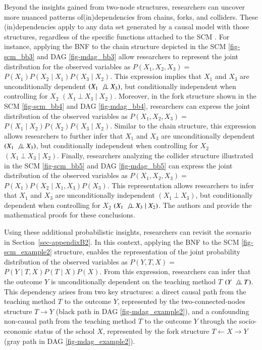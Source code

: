 \documentclass[
  authoryear,
  review,
  1p]{elsarticle}
\begin{document}
Beyond the insights gained from two-node structures, researchers can
uncover more nuanced patterns of(in)dependencies from chains, forks, and
colliders. These (in)dependencies apply to any data set generated by a
causal model with those structures, regardless of the specific functions
attached to the SCM \citep[pp.~36]{Pearl_et_al_2016}. For instance,
applying the BNF to the chain structure depicted in the SCM
\ref{fig-scm_bb3} and DAG \ref{fig-mdag_bb3} allow researchers to
represent the joint distribution for the observed variables as
\(P(X_{1},X_{2},X_{3}) =\)
\(P(X_{1}) P(X_{2} \mid X_{1}) P(X_{3} \mid X_{2})\). This expression
implies that \(X_{1}\) and \(X_{3}\) are unconditionally dependent
\((X_{1} \:\not\bot\:X_{3})\), but conditionally independent when
controlling for \(X_{2}\) \((X_{1} \:\bot\:X_{3} \mid X_{2})\).
Moreover, in the fork structure shown in the SCM \ref{fig-scm_bb4} and
DAG \ref{fig-mdag_bb4}, researchers can express the joint distribution
of the observed variables as \(P(X_{1},X_{2},X_{3}) =\)
\(P(X_{1} \mid X_{2}) P(X_{2}) P(X_{3} \mid X_{2})\). Similar to the
chain structure, this expression allows researchers to further infer
that \(X_{1}\) and \(X_{3}\) are unconditionally dependent
\((X_{1} \:\not\bot\:X_{3})\), but conditionally independent when
controlling for \(X_{2}\) \((X_{1} \:\bot\:X_{3} \mid X_{2})\). Finally,
researchers analyzing the collider structure illustrated in the SCM
\ref{fig-scm_bb5} and DAG \ref{fig-mdag_bb5} can express the joint
distribution of the observed variables as \(P(X_{1},X_{2},X_{3}) =\)
\(P(X_{1}) P(X_{2} \mid X_{1}, X_{3}) P(X_{3})\). This representation
allows researchers to infer that \(X_{1}\) and \(X_{3}\) are
unconditionally independent \((X_{1} \:\bot\:X_{3})\), but conditionally
dependent when controlling for \(X_{2}\)
\((X_{1} \:\not\bot\:X_{3} \mid X_{2})\). The authors \citet[pp.~37, 40,
41]{Pearl_et_al_2016} and \citet[pp.~25--26]{Neal_2020} provide the
mathematical proofs for these conclusions.

Using these additional probabilistic insights, researchers can revisit
the scenario in Section~\ref{sec-appendixB2}. In this context, applying
the BNF to the SCM \ref{fig-scm_example2} structure, enables the
representation of the joint probability distribution of the observed
variables as \(P(Y, T, X) =\) \(P(Y \mid T, X) P(T \mid X) P(X)\). From
this expression, researchers can infer that the outcome \(Y\) is
unconditionally dependent on the teaching method \(T\)
\((Y \:\not\bot\:T)\). This dependency arises from two key structures: a
direct causal path from the teaching method \(T\) to the outcome \(Y\),
represented by the two-connected-nodes structure \(T \rightarrow Y\)
(black path in DAG \ref{fig-mdag_example2}), and a confounding
non-causal path from the teaching method \(T\) to the outcome \(Y\)
through the socio-economic status of the school \(X\), represented by
the fork structure \(T \leftarrow X \rightarrow Y\) (gray path in DAG
\ref{fig-mdag_example2}).
\end{document}
